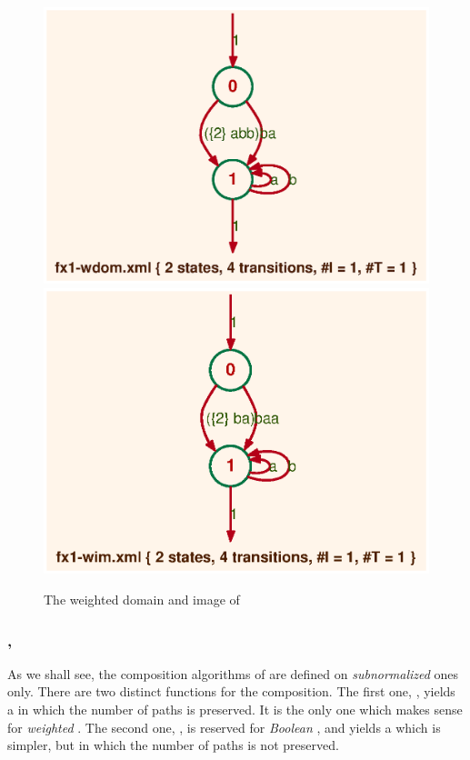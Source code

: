 \begin{figure}[ht]
    \centering
\includegraphics[scale=0.5]{figures/fx1-wdom.ps}
\ee
\includegraphics[scale=0.5]{figures/fx1-wim.ps}
\caption{The weighted domain and image of }
\label{fig:dom-im}
\end{figure}


\subsubsection{, } %
\label{ssc:fmp-com}

As we shall see, the composition algorithms of \fmpts are defined on 
\emph{subnormalized} ones only.
There are two distinct functions for the composition.
The first one, , yields a \fmpt in which the number 
of paths is preserved. 
It is the only one which makes sense for \emph{weighted} \fmpt.
The second one, , is reserved for \emph{Boolean} 
\fmpts, and yields a \fmpt which is simpler, but in which the number 
of paths is not preserved.


